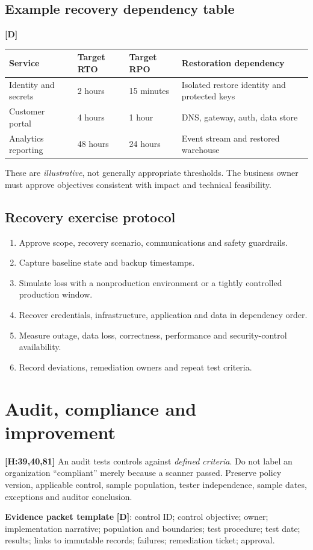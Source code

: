\documentclass[10pt,letterpaper,oneside]{article}
\newcommand{\handbookref}[1]{\textsf{\color{accent}\textbf{[H:#1]}}}
\newcommand{\designed}{\textsf{\color{accent}\textbf{[D]}}}
\begin{document}
\subsection{Example recovery dependency table}\designed{}
\par\medskip\noindent\begin{tabularx}{\textwidth}{@{}p{}p{}p{}X@{}}\toprule
Service & Target RTO & Target RPO & Restoration dependency \\ \midrule
Identity and secrets & 2 hours & 15 minutes & Isolated restore identity and protected keys\\
Customer portal & 4 hours & 1 hour & DNS, gateway, auth, data store\\
Analytics reporting & 48 hours & 24 hours & Event stream and restored warehouse\\
\bottomrule\end{tabularx}\par\medskip
These are \emph{illustrative}, not generally appropriate thresholds. The business owner must approve objectives consistent with impact and technical feasibility.
\subsection{Recovery exercise protocol}
\begin{enumerate}
\item Approve scope, recovery scenario, communications and safety guardrails.
\item Capture baseline state and backup timestamps.
\item Simulate loss with a nonproduction environment or a tightly controlled production window.
\item Recover credentials, infrastructure, application and data in dependency order.
\item Measure outage, data loss, correctness, performance and security-control availability.
\item Record deviations, remediation owners and repeat test criteria.
\end{enumerate}

\section{Audit, compliance and improvement}
\handbookref{39,40,81} An audit tests controls against \emph{defined criteria}. Do not label an organization ``compliant'' merely because a scanner passed. Preserve policy version, applicable control, sample population, tester independence, sample dates, exceptions and auditor conclusion.
\begin{sourcebox}\textbf{Evidence packet template} \designed{}: control ID; control objective; owner; implementation narrative; population and boundaries; test procedure; test date; results; links to immutable records; failures; remediation ticket; approval.\end{sourcebox}
\end{document}

